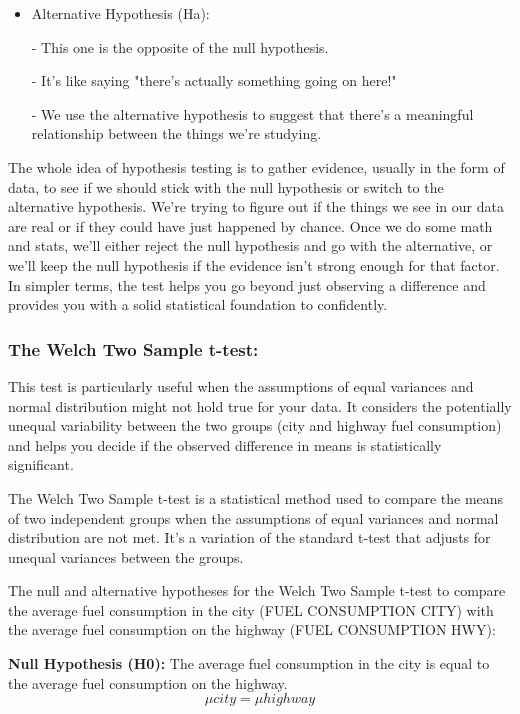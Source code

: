 \documentclass[12pt, a4paper,oneside]{book}
\numberwithin{equation}{section}
\begin{document}
\begin{itemize}
    \item Alternative Hypothesis (Ha):
    
   - This one is the opposite of the null hypothesis.
   
   - It's like saying "there's actually something going on here!"
   
   - We use the alternative hypothesis to suggest that there's a meaningful relationship between the things we're studying.
\end{itemize}

The whole idea of hypothesis testing is to gather evidence, usually in the form of data, to see if we should stick with the null hypothesis or switch to the alternative hypothesis. We're trying to figure out if the things we see in our data are real or if they could have just happened by chance. Once we do some math and stats, we'll either reject the null hypothesis and go with the alternative, or we'll keep the null hypothesis if the evidence isn't strong enough for that factor. In simpler terms, the test helps you go beyond just observing a difference and provides you with a solid statistical foundation to confidently.~\cite{ref10}


\subsubsection{The Welch Two Sample t-test:}

This test is particularly useful when the assumptions of equal variances and normal distribution might not hold true for your data. It considers the potentially unequal variability between the two groups (city and highway fuel consumption) and helps you decide if the observed difference in means is statistically significant.~\cite{ref10}

The Welch Two Sample t-test is a statistical method used to compare the means of two independent groups when the assumptions of equal variances and normal distribution are not met. It's a variation of the standard t-test that adjusts for unequal variances between the groups.

The null and alternative hypotheses for the Welch Two Sample t-test to compare the average fuel consumption in the city (FUEL CONSUMPTION CITY) with the average fuel consumption on the highway (FUEL CONSUMPTION HWY):


\textbf{Null Hypothesis (H0):}
The average fuel consumption in the city is equal to the average fuel consumption on the highway.
\begin{equation} 
     \mu city = \mu highway
\end{equation}
\end{document}
